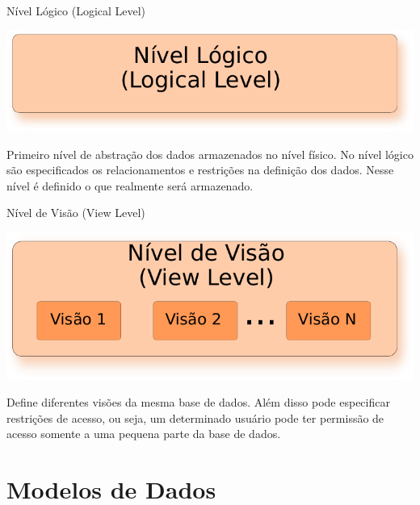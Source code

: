 \documentclass[xcolor=x11names,compress]{beamer}
\begin{document}
\begin{frame}{Nível Lógico (Logical Level)}

\begin{center}

\includegraphics[keepaspectratio,width=.5\textwidth]{sgbd_logical_level}

\end{center}
 
\begin{block}{}
Primeiro nível de abstração dos dados armazenados no nível físico. No nível lógico são especificados os relacionamentos e restrições na definição dos dados. Nesse nível é definido o que realmente será armazenado.
\end{block}

\end{frame}

\begin{frame}{Nível de Visão (View Level)}

\begin{center}

\includegraphics[keepaspectratio,width=.5\textwidth]{sgbd_view_level}

\end{center}
 
\begin{block}{}
Define diferentes visões da mesma base de dados. Além disso pode especificar restrições de acesso, ou seja, um determinado usuário pode ter permissão de acesso somente a uma pequena parte da base de dados.
\end{block}

\end{frame}


\section[Modelos]{Modelos de Dados}
\end{document}
